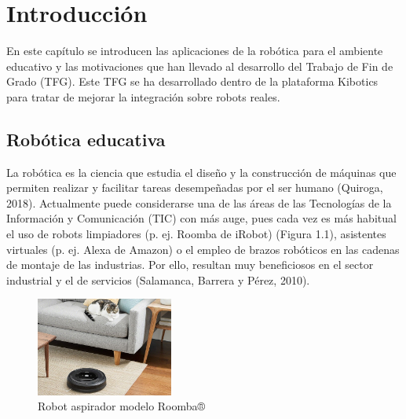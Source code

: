 \documentclass{report}
\begin{document}
\renewcommand{\chaptername}{Capítulo}


\chapter{Introducción}

En este capítulo se introducen las aplicaciones de la robótica para el ambiente educativo y las motivaciones que han llevado al desarrollo del Trabajo de Fin de Grado (TFG). Este TFG se ha desarrollado dentro de la plataforma Kibotics para tratar de mejorar la integración sobre robots reales.

\section{Robótica educativa}

La robótica es la ciencia que estudia el diseño y la construcción de máquinas que permiten realizar y facilitar tareas desempeñadas por el ser humano (Quiroga, 2018). Actualmente puede considerarse una de las áreas de las Tecnologías de la Información y Comunicación (TIC) con más auge, pues cada vez es más habitual el uso de robots limpiadores (p. ej. Roomba de iRobot) (Figura 1.1), asistentes virtuales (p. ej. Alexa de Amazon) o el empleo de brazos robóticos en las cadenas de montaje de las industrias. Por ello, resultan muy beneficiosos en el sector industrial y el de servicios (Salamanca, Barrera y Pérez, 2010).
\\
\begin{figure}
  \centering
    \includegraphics[width=0.4\textwidth]{images/romba.png}
  \caption{Robot aspirador modelo Roomba®}
  \label{Roomba}
\end{figure}
\\
\end{document}
